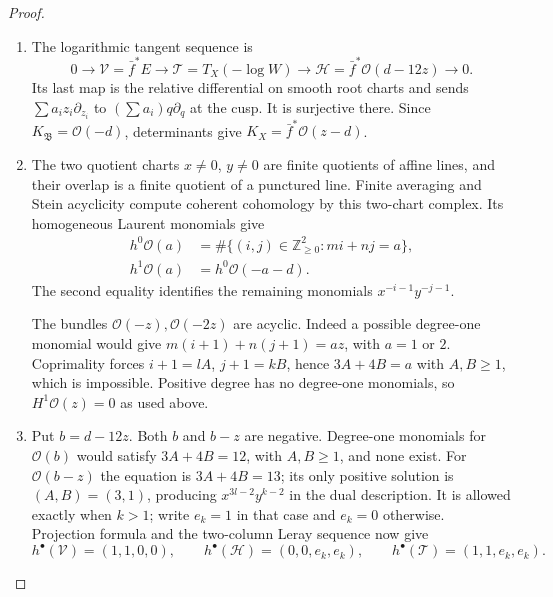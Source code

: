 \begin{proof}
\begin{enumerate}[label=\arabic*.,leftmargin=*]
\item The logarithmic tangent sequence is
\[
 0\longrightarrow\mathcal V=\bar f^*E
 \longrightarrow\mathcal T=T_X(-\log W)
 \longrightarrow\mathcal H=\bar f^*\mathcal O(d-12z)
 \longrightarrow0.
\]
Its last map is the relative differential on smooth root charts
and sends $\sum a_i z_i\partial_{z_i}$ to
$(\sum a_i)q\partial_q$ at the cusp.  It is surjective there.
Since $K_{\mathfrak B}=\mathcal O(-d)$, determinants give
$K_X=\bar f^*\mathcal O(z-d)$.

\item The two quotient charts $x\ne0$, $y\ne0$ are finite quotients
of affine lines, and their overlap is a finite quotient of a
punctured line.  Finite averaging and Stein acyclicity compute
coherent cohomology by this two-chart complex.  Its homogeneous
Laurent monomials give
\[
 \begin{split}
 h^0\mathcal O(a)&=\#\{(i,j)\in\mathbb Z_{\ge0}^2:mi+nj=a\},\\
 h^1\mathcal O(a)&=h^0\mathcal O(-a-d).
 \end{split}
\]
The second equality identifies the remaining monomials
$x^{-i-1}y^{-j-1}$.

The bundles $\mathcal O(-z),\mathcal O(-2z)$ are acyclic.
Indeed a possible degree-one monomial would give
$m(i+1)+n(j+1)=az$, with $a=1$ or $2$.
Coprimality forces $i+1=lA$, $j+1=kB$, hence
$3A+4B=a$ with $A,B\ge1$, which is impossible.
Positive degree has no degree-one monomials, so
$H^1\mathcal O(z)=0$ as used above.

\item Put $b=d-12z$.  Both $b$ and $b-z$ are negative.
Degree-one monomials for $\mathcal O(b)$ would satisfy
$3A+4B=12$, with $A,B\ge1$, and none exist.
For $\mathcal O(b-z)$ the equation is $3A+4B=13$;
its only positive solution is $(A,B)=(3,1)$, producing
$x^{3l-2}y^{k-2}$ in the dual description.  It is allowed
exactly when $k>1$; write $e_k=1$ in that case and $e_k=0$
otherwise.  Projection formula and the two-column Leray sequence
now give
\[
 h^\bullet(\mathcal V)=(1,1,0,0),\qquad
 h^\bullet(\mathcal H)=(0,0,e_k,e_k),\qquad
 h^\bullet(\mathcal T)=(1,1,e_k,e_k).
\]


\end{enumerate}
\end{proof}
